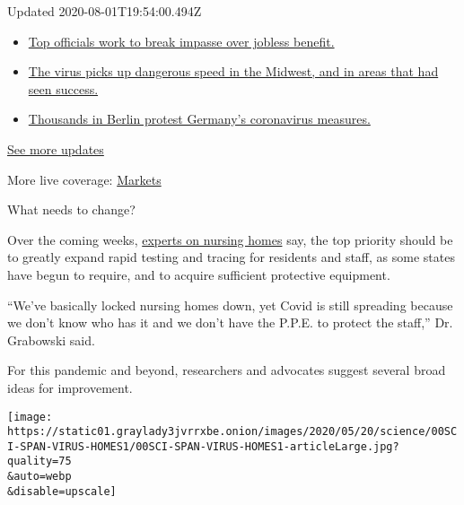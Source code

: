 Updated 2020-08-01T19:54:00.494Z

\begin{itemize}
\tightlist
\item
  \href{https://www.nytimes3xbfgragh.onion/2020/08/01/world/coronavirus-covid-19.html?action=click\&pgtype=Article\&state=default\&region=MAIN_CONTENT_1\&context=storylines_live_updates\#link-3ac56579}{Top
  officials work to break impasse over jobless benefit.}
\item
  \href{https://www.nytimes3xbfgragh.onion/2020/08/01/world/coronavirus-covid-19.html?action=click\&pgtype=Article\&state=default\&region=MAIN_CONTENT_1\&context=storylines_live_updates\#link-8796723}{The
  virus picks up dangerous speed in the Midwest, and in areas that had
  seen success.}
\item
  \href{https://www.nytimes3xbfgragh.onion/2020/08/01/world/coronavirus-covid-19.html?action=click\&pgtype=Article\&state=default\&region=MAIN_CONTENT_1\&context=storylines_live_updates\#link-25930521}{Thousands
  in Berlin protest Germany's coronavirus measures.}
\end{itemize}

\href{https://www.nytimes3xbfgragh.onion/2020/08/01/world/coronavirus-covid-19.html?action=click\&pgtype=Article\&state=default\&region=MAIN_CONTENT_1\&context=storylines_live_updates}{See
more updates}

More live coverage:
\href{https://www.nytimes3xbfgragh.onion/live/2020/07/31/business/stock-market-today-coronavirus?action=click\&pgtype=Article\&state=default\&region=MAIN_CONTENT_1\&context=storylines_live_updates}{Markets}

What needs to change?

Over the coming weeks,
\href{https://onlinelibrary.wiley.com/doi/full/10.1111/jgs.16477}{experts
on nursing homes} say, the top priority should be to greatly expand
rapid testing and tracing for residents and staff, as some states have
begun to require, and to acquire sufficient protective equipment.

``We've basically locked nursing homes down, yet Covid is still
spreading because we don't know who has it and we don't have the P.P.E.
to protect the staff,'' Dr. Grabowski said.

For this pandemic and beyond, researchers and advocates suggest several
broad ideas for improvement.

\texttt{[image: https://static01.graylady3jvrrxbe.onion/images/2020/05/20/science/00SCI-SPAN-VIRUS-HOMES1/00SCI-SPAN-VIRUS-HOMES1-articleLarge.jpg?quality=75\\\&auto=webp\\\&disable=upscale]}

